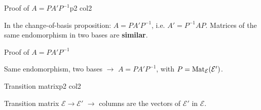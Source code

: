 \documentclass[sheet,noautoquant,noautokw]{neyvia-study}
\begin{document}
\begin{concept}[1.57]{Proof of $A=PA'P^{-1}$}{p2 col2}
\begin{definition}
\noindent In the change-of-basis proposition: $A=PA'P^{-1}$, i.e. $A'=P^{-1}AP$. Matrices of the same endomorphism in two bases are \textbf{similar}.
\end{definition}
\begin{method}{Proof of $A=PA'P^{-1}$}
\end{method}
\begin{reflex}
Same endomorphism, two bases \ensuremath{\rightarrow} $A=PA'P^{-1}$, with $P=\operatorname{Mat}_{\mathcal E}(\mathcal E')$.
\end{reflex}
\end{concept}
\begin{concept}[1.58]{Transition matrix}{p2 col2}
\begin{definition}
\end{definition}
\begin{reflex}
Transition matrix $\mathcal E\to\mathcal E'$ \ensuremath{\rightarrow} columns are the vectors of $\mathcal E'$ in $\mathcal E$.
\end{reflex}
\end{concept}
\end{document}
